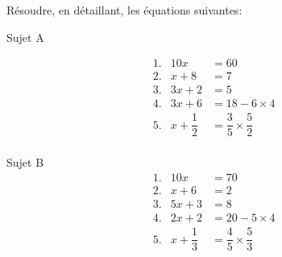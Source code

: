 \documentclass{beamer}
\begin{document}
\small

\begin{frame}
	Résoudre, en détaillant, les équations suivantes:

	\setlength{\columnseprule}{0.7pt}
	\begin{multicols}{2}
		\begin{center}
			Sujet A

			\begin{align*}
				 & 1. & 10x              & = 60                          \\[0.5em]
				 & 2. & x + 8            & = 7                           \\[0.5em]
				 & 3. & 3x +2            & = 5                           \\[0.5em]
				 & 4. & 3x + 6           & = 18 - 6 × 4                  \\
				 & 5. & x + \dfrac{1}{2} & = \dfrac{3}{5} × \dfrac{5}{2} \\[0.5em]
			\end{align*}
		\end{center}

		\columnbreak

		\begin{center}
			Sujet B
			\begin{align*}
				 & 1. & 10x              & = 70                          \\[0.5em]
				 & 2. & x + 6            & = 2                           \\[0.5em]
				 & 3. & 5x + 3           & = 8                           \\[0.5em]
				 & 4. & 2x + 2           & = 20 - 5 × 4                  \\
				 & 5. & x + \dfrac{1}{3} & = \dfrac{4}{5} × \dfrac{5}{3} \\[0.5em]
			\end{align*}
		\end{center}
	\end{multicols}
\end{frame}
\end{document}
